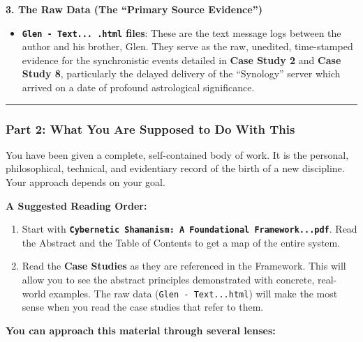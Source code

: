 \documentclass{article}
\begin{document}
\textbf{3. The Raw Data (The ``Primary Source Evidence'')}

\begin{itemize}
\item
  \textbf{\texttt{Glen~-~Text...~.html} files}: These are the text message logs between the author and his brother, Glen. They serve as the raw, unedited, time-stamped evidence for the synchronistic events detailed in \textbf{Case Study 2} and \textbf{Case Study 8}, particularly the delayed delivery of the ``Synology'' server which arrived on a date of profound astrological significance.
\end{itemize}

\begin{center}\rule{0.5\linewidth}{0.5pt}\end{center}

\subsubsection*{\texorpdfstring{\textbf{Part 2: What You Are Supposed to Do With This}}{Part 2: What You Are Supposed to Do With This}}\label{part-2-what-you-are-supposed-to-do-with-this}

You have been given a complete, self-contained body of work. It is the personal, philosophical, technical, and evidentiary record of the birth of a new discipline. Your approach depends on your goal.

\textbf{A Suggested Reading Order:}

\begin{enumerate}
\item
  Start with \textbf{\texttt{Cybernetic~Shamanism:~A~Foundational~Framework...pdf}}. Read the Abstract and the Table of Contents to get a map of the entire system.
\item
  Read the \textbf{Case Studies} as they are referenced in the Framework. This will allow you to see the abstract principles demonstrated with concrete, real-world examples. The raw data (\texttt{Glen~-~Text...html}) will make the most sense when you read the case studies that refer to them.
\end{enumerate}

\textbf{You can approach this material through several lenses:}
\end{document}

